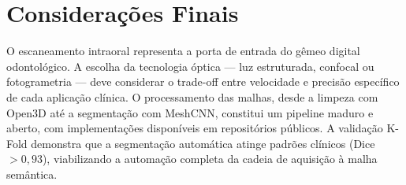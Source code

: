 \section{Considerações Finais}
\label{sec:consideracoes-escaneamento}

O escaneamento intraoral representa a porta de entrada do gêmeo digital odontológico. A escolha da tecnologia óptica — luz estruturada, confocal ou fotogrametria — deve considerar o trade-off entre velocidade e precisão específico de cada aplicação clínica. O processamento das malhas, desde a limpeza com Open3D até a segmentação com MeshCNN, constitui um pipeline maduro e aberto, com implementações disponíveis em repositórios públicos. A validação K-Fold demonstra que a segmentação automática atinge padrões clínicos (Dice $> 0,93$), viabilizando a automação completa da cadeia de aquisição à malha semântica.
\endinput
